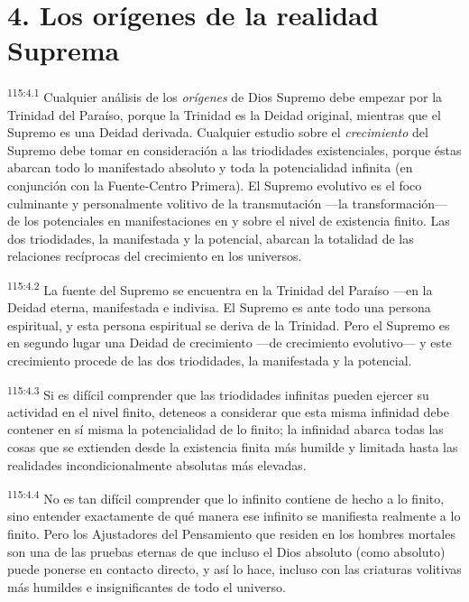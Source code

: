 \section*{4. Los orígenes de la realidad Suprema}
\par
\textsuperscript{115:4.1} Cualquier análisis de los \textit{orígenes} de Dios Supremo debe empezar por la Trinidad del Paraíso, porque la Trinidad es la Deidad original, mientras que el Supremo es una Deidad derivada. Cualquier estudio sobre el \textit{crecimiento} del Supremo debe tomar en consideración a las triodidades existenciales, porque éstas abarcan todo lo manifestado absoluto y toda la potencialidad infinita (en conjunción con la Fuente-Centro Primera). El Supremo evolutivo es el foco culminante y personalmente volitivo de la transmutación ---la transformación--- de los potenciales en manifestaciones en y sobre el nivel de existencia finito. Las dos triodidades, la manifestada y la potencial, abarcan la totalidad de las relaciones recíprocas del crecimiento en los universos.

\par
\textsuperscript{115:4.2} La fuente del Supremo se encuentra en la Trinidad del Paraíso ---en la Deidad eterna, manifestada e indivisa. El Supremo es ante todo una persona espiritual, y esta persona espiritual se deriva de la Trinidad. Pero el Supremo es en segundo lugar una Deidad de crecimiento ---de crecimiento evolutivo--- y este crecimiento procede de las dos triodidades, la manifestada y la potencial.

\par
\textsuperscript{115:4.3} Si es difícil comprender que las triodidades infinitas pueden ejercer su actividad en el nivel finito, deteneos a considerar que esta misma infinidad debe contener en sí misma la potencialidad de lo finito; la infinidad abarca todas las cosas que se extienden desde la existencia finita más humilde y limitada hasta las realidades incondicionalmente absolutas más elevadas.

\par
\textsuperscript{115:4.4} No es tan difícil comprender que lo infinito contiene de hecho a lo finito, sino entender exactamente de qué manera ese infinito se manifiesta realmente a lo finito. Pero los Ajustadores del Pensamiento que residen en los hombres mortales son una de las pruebas eternas de que incluso el Dios absoluto (como absoluto) puede ponerse en contacto directo, y así lo hace, incluso con las criaturas volitivas más humildes e insignificantes de todo el universo.

